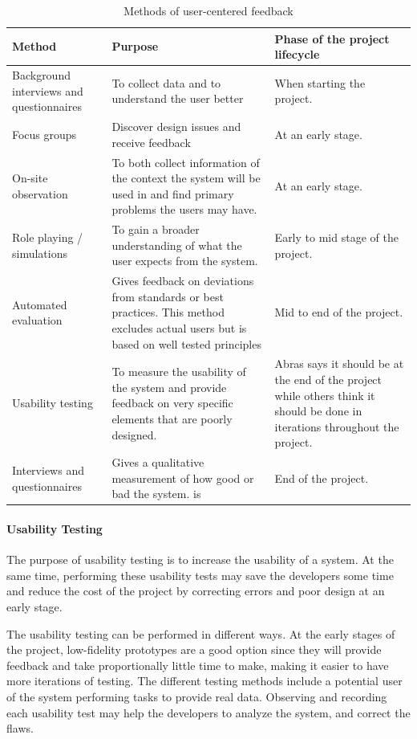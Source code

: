 \begin{table}[H]
\begin{tabular}{|p{5cm} | p{5cm} | p{5cm} |}
\hline
\textbf{Method} & \textbf{Purpose} & \textbf{Phase of the project lifecycle} \\ \hline
Background interviews and questionnaires & To collect data and to understand the user better & When starting the project. \\ \hline
Focus groups & Discover design issues and receive feedback & At an early stage. \\ \hline
On-site observation & To both collect information of the context the system will be used in and find primary problems the users may have. & At an early stage. \\ \hline
Role playing / simulations & To gain a broader understanding of what the user expects from the system. & Early to mid stage of the project. \\ \hline
Automated evaluation & Gives feedback on deviations from standards or best practices. This method excludes actual users but is based on well tested principles & Mid to end of the project. \\ \hline
Usability testing & To measure the usability of the system and provide feedback on very specific elements that are poorly designed. & Abras\cite{abrasusercentereddesign} says it should be at the end of the project while others\cite{schneidermanusercentered} think it should be done in iterations throughout the project. \\ \hline
Interviews and questionnaires & Gives a qualitative measurement of how good or bad the system. is & End of the project. \\ \hline
\end{tabular}
\caption{Methods of user-centered feedback}
\label{table:designduringlifecycle}
\end{table}


\paragraph{Usability Testing}
The purpose of usability testing is to increase the usability of a system. At the same time, performing these usability tests may save the developers some time and reduce the cost of the project by correcting errors and poor design at an early stage\cite{dumas1995practical}.

The usability testing can be performed in different ways\cite{schneidermanusercentered}. At the early stages of the project, low-fidelity prototypes are a good option since they will provide feedback and take proportionally little time to make, making it easier to have more iterations of testing. The different testing methods include a potential user of the system performing tasks to provide real data. Observing and recording each usability test may help the developers to analyze the system, and correct the flaws\cite{dumas1995practical}. 

